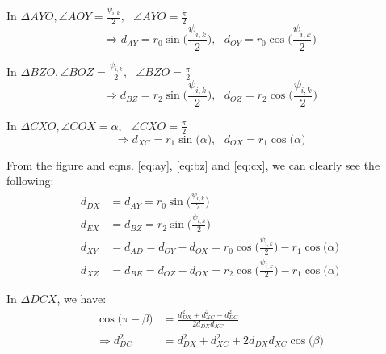         In $\Delta AYO ,\angle AOY = \displaystyle\frac{\psi_{i,k}}{2}, \: \: \: \angle AYO = \frac{\pi}{2}$
        \begin{equation}
        \label{eq:ay}
            \Rightarrow d_{AY} = r_0  \sin \Big(\displaystyle\frac{\psi_{i,k}}{2}\Big), \: \: \: d_{OY} = r_0  \cos \Big(\displaystyle\frac{\psi_{i,k}}{2}\Big)
        \end{equation}

        In $\Delta BZO ,\angle BOZ = \displaystyle\frac{\psi_{i,k}}{2}, \: \: \: \angle BZO = \frac{\pi}{2}$
        \begin{equation}
        \label{eq:bz}
            \Rightarrow d_{BZ} = r_2  \sin \Big(\displaystyle\frac{\psi_{i,k}}{2}\Big), \: \: \: d_{OZ} = r_2  \cos \Big(\displaystyle\frac{\psi_{i,k}}{2}\Big)
        \end{equation}

        In $\Delta CXO ,\angle COX = \alpha, \: \: \: \angle CXO = \frac{\pi}{2}$
        \begin{equation}
        \label{eq:cx}
            \Rightarrow d_{XC} = r_1  \sin \big(\alpha\big), \: \: \: d_{OX} = r_1  \cos \big(\alpha\big)
        \end{equation}

        From the figure and eqns. \eqref{eq:ay}, \eqref{eq:bz} and \eqref{eq:cx}, we can clearly see the following:
        \begin{equation}
        \label{eq:adbe}
            \begin{aligned}
                d_{DX} &= d_{AY} = r_0  \sin \Big(\displaystyle\frac{\psi_{i,k}}{2}\Big)\\
                d_{EX} &= d_{BZ} = r_2  \sin \Big(\displaystyle\frac{\psi_{i,k}}{2}\Big)\\
                d_{XY} &= d_{AD} = d_{OY} - d_{OX} = r_0  \cos \Big(\displaystyle\frac{\psi_{i,k}}{2}\Big) - r_1  \cos \big(\alpha\big)\\
                d_{XZ} &= d_{BE} = d_{OZ} - d_{OX} = r_2  \cos \Big(\displaystyle\frac{\psi_{i,k}}{2}\Big) - r_1  \cos \big(\alpha\big)
            \end{aligned}
        \end{equation}

        In $\Delta DCX$, we have:
        \begin{equation}
        \label{eq:dc}
            \begin{aligned}
                \cos \big( \pi - \beta \big) &= \frac{d_{DX}^2 + d_{XC}^2 - d_{DC}^2}{2  d_{DX}  d_{XC}}\\
                \Rightarrow d_{DC}^2 &= d_{DX}^2 + d_{XC}^2 + 2  d_{DX}  d_{XC}  \cos \big( \beta \big)
            \end{aligned}
        \end{equation}

